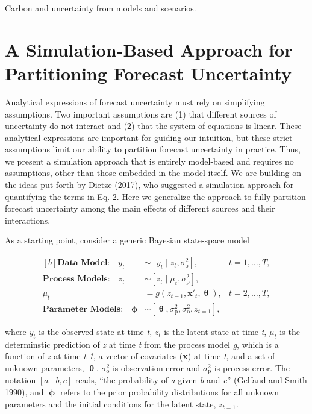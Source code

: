 \documentclass[12pt,]{article}
\begin{document}
Carbon and uncertainty from models and scenarios.

\hypertarget{a-simulation-based-approach-for-partitioning-forecast-uncertainty}{%
\section{A Simulation-Based Approach for Partitioning Forecast
Uncertainty}\label{a-simulation-based-approach-for-partitioning-forecast-uncertainty}}

Analytical expressions of forecast uncertainty must rely on simplifying
assumptions. Two important assumptions are (1) that different sources of
uncertainty do not interact and (2) that the system of equations is
linear. These analytical expressions are important for guiding our
intuition, but these strict assumptions limit our ability to partition
forecast uncertainty in practice. Thus, we present a simulation approach
that is entirely model-based and requires no assumptions, other than
those embedded in the model itself. We are building on the ideas put
forth by Dietze (2017), who suggested a simulation approach for
quantifying the terms in Eq. 2. Here we generalize the approach to fully
partition forecast uncertainty among the main effects of different
sources and their interactions.

As a starting point, consider a generic Bayesian state-space model

\begin{equation}
\begin{aligned}[b]
\textbf{Data Model:} \quad y_t &\sim \left[y_t \;|\; z_t, \sigma^2_{\text{o}}\right], &t = 1,\dots,T, \\ 
\textbf{Process Models:} \quad z_t &\sim \left[z_t \;|\; \mu_t, \sigma^2_{\text{p}}\right],  \\ 
\mu_t &= g \left(z_{t-1},\textbf{x}'_t, \bm{\uptheta} \right), &t = 2,\dots,T, \\ 
\textbf{Parameter Models:} \quad \bm{\upphi} &\sim \left[\bm{\uptheta},\sigma^2_{\text{p}},\sigma^2_{\text{o}},z_{t=1} \right],
\end{aligned}
\end{equation}

\noindent{}where \(y_t\) is the observed state at time \emph{t}, \(z_t\)
is the latent state at time \emph{t}, \(\mu_t\) is the determinstic
prediction of \emph{z} at time \emph{t} from the process model \emph{g},
which is a function of \emph{z} at time \emph{t-1}, a vector of
covariates (\textbf{x}) at time \emph{t}, and a set of unknown
parameters, \(\bm{\uptheta}\). \(\sigma^2_{\text{o}}\) is observation
error and \(\sigma^2_{\text{p}}\) is process error. The notation
\(\left[a \;|\; b, c\right]\) reads, ``the probability of \emph{a} given
\emph{b} and \emph{c}'' (Gelfand and Smith 1990), and \(\bm{\upphi}\)
refers to the prior probability distributions for all unknown parameters
and the initial conditions for the latent state, \(z_{t=1}\).
\end{document}
